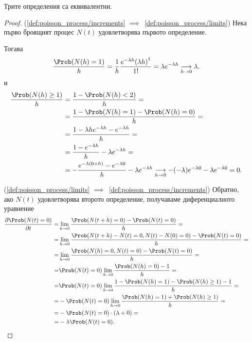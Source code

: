 \documentclass[numbers=endperiod, bibliography=totocnumbered]{scrartcl}
\begin{document}
\begin{theorem}
  Трите определения са еквивалентни.
\end{theorem}
\begin{proof}
  (\ref{def:poisson_process/increments} \( \implies \)~\ref{def:poisson_process/limits}) Нека първо броящият процес \( N(t) \) удовлетворява първото определение.

  Тогава
  \begin{equation*}
    \frac {\Prob(N(h) = 1)} h
    =
    \frac 1 h \frac {e^{-\lambda h} {(\lambda h)}^1} {1!}
    =
    \lambda e^{-\lambda h}
    \Conv[h \to 0]{}
    \lambda.
  \end{equation*}
  и
  \begin{align*}
    \frac {\Prob(N(h) \geq 1)} h
    &=
    \frac {1 - \Prob(N(h) < 2)} h
    = \\ &=
    \frac {1 - \Prob(N(h) = 1) - \Prob(N(h) = 0)} h
    = \\ &=
    \frac {1 - \lambda h e^{-\lambda h} - e^{-\lambda h}} h
    = \\ &=
    \frac {1 - e^{-\lambda h}} h - \lambda e^{-\lambda h}
    = \\ &=
    - \frac {e^{-\lambda (0 + h)} - e^{-\lambda 0}} h - \lambda e^{-\lambda h}
    \Conv[h \to 0]{}
    -(-\lambda) e^{-\lambda 0} - \lambda e^{-\lambda 0}
    =
    0.
  \end{align*}

  (\ref{def:poisson_process/limits} \( \implies \)~\ref{def:poisson_process/increments}) Обратно, ако \( N(t) \) удовлетворява второто определение, получаваме диференциалното уравнение
  \begin{align*}
    \frac {\partial \Prob(N(t) = 0)} {\partial t}
    =&
    \lim_{h \to 0} \frac {\Prob(N(t+h) = 0) - \Prob(N(t) = 0)} h
    = \\ =&
    \lim_{h \to 0} \frac {\Prob(N(t+h) - N(t) = 0, N(t) - N(0) = 0) - \Prob(N(t) = 0)} h
    = \\ =&
    \lim_{h \to 0} \frac {\Prob(N(h) = 0, N(t) = 0) - \Prob(N(t) = 0)} h
    = \\ =&
    \Prob(N(t) = 0) \lim_{h \to 0} \frac {\Prob(N(h) = 0) - 1} h
    = \\ =&
    \Prob(N(t) = 0) \lim_{h \to 0} \frac {1 - \Prob(N(h) = 1) - \Prob(N(h) \geq 1) - 1} h
    = \\ =&
    - \Prob(N(t) = 0) \lim_{h \to 0} \frac {\Prob(N(h) = 1) + \Prob(N(h) \geq 1)} h
    = \\ =&
    - \Prob(N(t) = 0) \cdot (\lambda + 0)
    = \\ =&
    -\lambda \Prob(N(t) = 0).
  \end{align*}


\end{proof}
\end{document}
